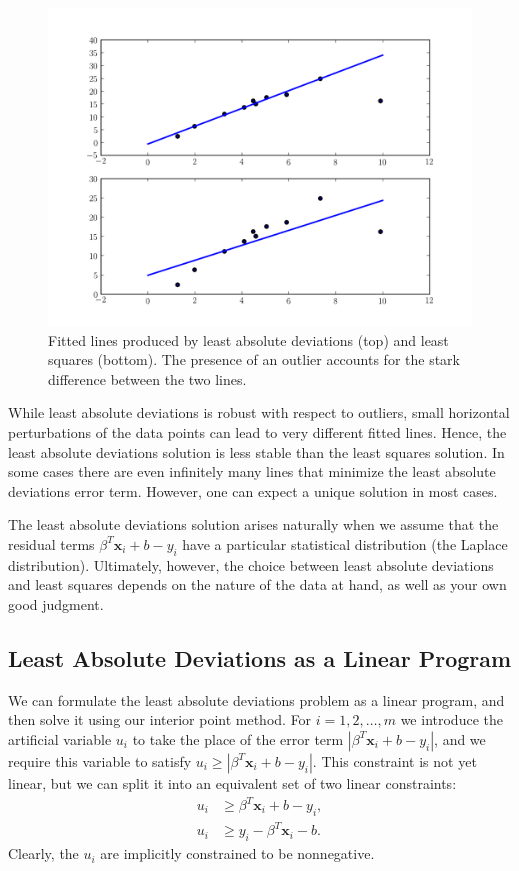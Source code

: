 \begin{figure}
\centering
\includegraphics[width=\textwidth]{leastAbsDev.pdf}
\caption{Fitted lines produced by least absolute deviations (top) and least squares (bottom). The presence of an outlier accounts for the
stark difference between the two lines.}
\label{fig:leastAbsDev}
\end{figure}

While least absolute deviations is robust with respect to outliers, small horizontal perturbations of the data points can lead to very different
fitted lines. Hence, the least absolute deviations solution is less stable than the least squares solution. In some cases there are even infinitely
many lines that minimize the least absolute deviations error term. However, one can expect a unique solution in most cases.

The least absolute deviations solution arises naturally when we assume that the residual terms $\beta^T\mathbf{x}_i + b - y_i$ have a particular
statistical distribution (the Laplace distribution). Ultimately, however, the choice between least absolute deviations and least squares depends on the
nature of the data at hand, as well as your own good judgment.

\subsection{Least Absolute Deviations as a Linear Program}
We can formulate the least absolute deviations problem as a linear program, and then solve it using our interior point method.
For $i = 1, 2, \ldots, m$ we introduce the artificial variable $u_i$ to take the place of the error term $|\beta^T\mathbf{x}_i + b - y_i|$,
and we require this variable to satisfy $u_i \geq |\beta^T\mathbf{x}_i + b - y_i|$. This constraint is not yet linear, but we can split it into
an equivalent set of two linear constraints:
\begin{align*}
u_i &\geq \beta^T\mathbf{x}_i + b - y_i,\\
u_i &\geq y_i - \beta^T\mathbf{x}_i - b.
\end{align*}
Clearly, the $u_i$ are implicitly constrained to be nonnegative.


